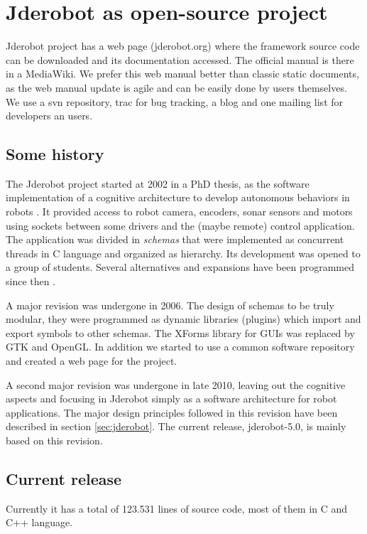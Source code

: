 \documentclass[twocolumn]{svjour3}          %
\begin{document}
\section{Jderobot as open-source project}

Jderobot project has a web page (jderobot.org) where the framework source code can be downloaded and its documentation accessed. The official manual is there in a MediaWiki. We prefer this web manual better than classic static documents, as the web manual update is agile and can be easily done by users themselves. We use a svn repository, trac for bug tracking, a blog and one mailing list for developers an users.

\subsection{Some history}

The Jderobot project started at 2002 in a PhD thesis, as the software implementation of a cognitive architecture to develop autonomous behaviors in robots \cite{canas02,canas05e}. It provided access to robot camera, encoders, sonar sensors and motors using sockets between some drivers and the (maybe remote) control application. The application was divided in \textit{schemas} that were implemented as concurrent threads in C language and organized as hierarchy. Its development was opened to a group of students. Several alternatives and expansions have been programmed since then \cite{canas07,canas07f}. 

A major revision was undergone in 2006. The design of schemas to be truly modular, they were programmed as dynamic libraries (plugins) which import and export symbols to other schemas. The XForms library for GUIs was replaced by GTK and OpenGL. In addition we started to use a common software repository and created a web page for the project. 

A second major revision was undergone in late 2010, leaving out the cognitive aspects and focusing in Jderobot simply as a software architecture for robot applications. The major design principles followed in this revision have been described in section \ref{sec:jderobot}. The current release, jderobot-5.0, is mainly based on this revision.

\subsection{Current release}
Currently it has a total of 123.531 lines of source code, most of them in C and C++ language.
\end{document}
